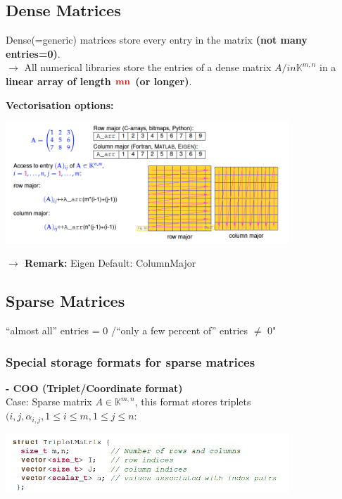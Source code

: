 \documentclass[12pt, a4paper]{article}
\newcommand{\K}{\mathbb{K}}
\begin{document}
\subsection{Dense Matrices}
\begin{tcolorbox}
	Dense(=generic) matrices store every entry in the matrix \textbf{(not many entries=0)}.  \vspace{-1mm}\\
	$\rightarrow$ All numerical libraries store the entries of a dense matrix $A /in \K^{m,n}$ in a \textbf{linear array of length $\color{red}\mathbf{mn}$ (or longer)}. 
\end{tcolorbox}

\textbf{Vectorisation options:} 
\begin{center}
\includegraphics[width=0.8\textwidth]{DenseMatrix.png}
\end{center}

\textbf{$\rightarrow$ Remark:} Eigen Default: ColumnMajor

\subsection{Sparse Matrices}
\begin{tcolorbox}
	“almost all” entries = 0 /“only a few percent of” entries $\not =$ 0"
\end{tcolorbox}




\subsubsection{Special storage formats for sparse matrices}
\textbf{- COO (Triplet/Coordinate format)} \\
Case: Sparse matrix $A \in \K^{m,n}$, this format stores triplets $(i, j, \alpha_{i,j}, 1\leq i \leq m, 1\leq j \leq n:$
\begin{center}
	\includegraphics[width=0.8\textwidth]{SparseMatrix_COO.png}
\end{center}
\end{document}
